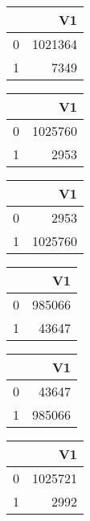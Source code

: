 \bigskip\bigskip
\centering
\begin{tabular}{rr}
  \hline
 & V1 \\ 
  \hline
0 & 1021364 \\ 
  1 & 7349 \\ 
   \hline
\end{tabular}

\bigskip\bigskip
\centering
\begin{tabular}{rr}
  \hline
 & V1 \\ 
  \hline
0 & 1025760 \\ 
  1 & 2953 \\ 
   \hline
\end{tabular}

\bigskip\bigskip
\centering
\begin{tabular}{rr}
  \hline
 & V1 \\ 
  \hline
0 & 2953 \\ 
  1 & 1025760 \\ 
   \hline
\end{tabular}

\bigskip\bigskip
\centering
\begin{tabular}{rr}
  \hline
 & V1 \\ 
  \hline
0 & 985066 \\ 
  1 & 43647 \\ 
   \hline
\end{tabular}

\bigskip\bigskip
\centering
\begin{tabular}{rr}
  \hline
 & V1 \\ 
  \hline
0 & 43647 \\ 
  1 & 985066 \\ 
   \hline
\end{tabular}

\bigskip\bigskip
\centering
\begin{tabular}{rr}
  \hline
 & V1 \\ 
  \hline
0 & 1025721 \\ 
  1 & 2992 \\ 
   \hline
\end{tabular}

